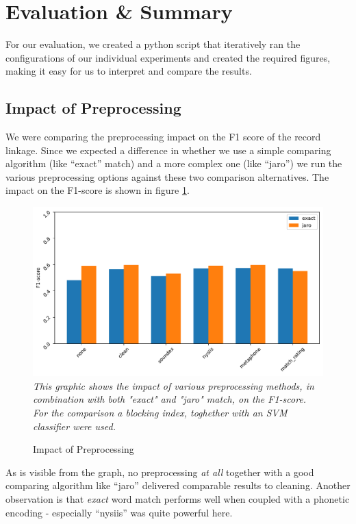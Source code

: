 \documentclass[sigconf,nonacm]{acmart}
\begin{document}
\section{Evaluation \& Summary}

For our evaluation, we created a python script that iteratively
ran the configurations of our individual experiments and created
the required figures, making it easy for us to interpret and
compare the results.

\subsection{Impact of Preprocessing}

We were comparing the preprocessing impact on the F1 score of
the record linkage.
Since we expected a difference in whether we use a simple comparing
algorithm (like ``exact'' match) and a more complex one (like ``jaro'')
we run the various preprocessing options against these two comparison
alternatives.
The impact on the F1-score is shown in figure \ref{plot:preprocessing}.

\begin{figure}[h]
\centering
\caption{Impact of Preprocessing}
\label{plot:preprocessing}
\includegraphics[width=0.9\linewidth]{../figures/eval_preprocessing}\\[-2mm]
\emph{\small
This graphic shows the impact of various preprocessing methods, in combination with both "exact" and "jaro" match, on the F1-score.
For the comparison a blocking index, toghether with an SVM classifier were used.}
\end{figure}

As is visible from the graph, no preprocessing \emph{at all} together
with a good comparing algorithm like ``jaro'' delivered comparable results
to cleaning.
Another observation is that \emph{exact} word match performs well when coupled
with a phonetic encoding - especially ``nysiis'' was quite powerful here.
\end{document}
